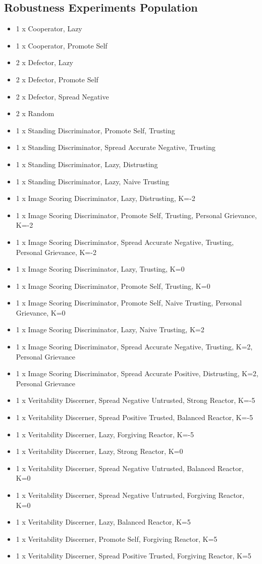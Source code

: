 \documentclass[]{final_report}
\begin{document}
\subsection{Robustness Experiments Population}
\label{appendix:populations}
\begin{itemize}
	\item 1 x Cooperator, Lazy
	\item 1 x Cooperator, Promote Self
	\item 2 x Defector, Lazy
	\item 2 x Defector, Promote Self
	\item 2 x Defector, Spread Negative
	\item 2 x Random
	\item 1 x Standing Discriminator, Promote Self, Trusting
	\item 1 x Standing Discriminator, Spread Accurate Negative, Trusting
	\item 1 x Standing Discriminator, Lazy, Distrusting
	\item 1 x Standing Discriminator, Lazy, Naive Trusting
	\item 1 x Image Scoring Discriminator, Lazy, Distrusting, K=-2
	\item 1 x Image Scoring Discriminator, Promote Self, Trusting, Personal Grievance, K=-2
	\item 1 x Image Scoring Discriminator, Spread Accurate Negative, Trusting, Personal Grievance, K=-2
	\item 1 x Image Scoring Discriminator, Lazy, Trusting, K=0
	\item 1 x Image Scoring Discriminator, Promote Self, Trusting, K=0
	\item 1 x Image Scoring Discriminator, Promote Self, Naive Trusting, Personal Grievance, K=0
	\item 1 x Image Scoring Discriminator, Lazy, Naive Trusting, K=2
	\item 1 x Image Scoring Discriminator, Spread Accurate Negative, Trusting, K=2, Personal Grievance
	\item 1 x Image Scoring Discriminator, Spread Accurate Positive, Distrusting, K=2, Personal Grievance
	\item 1 x Veritability Discerner, Spread Negative Untrusted, Strong Reactor, K=-5
	\item 1 x Veritability Discerner, Spread Positive Trusted, Balanced Reactor, K=-5
	\item 1 x Veritability Discerner, Lazy, Forgiving Reactor, K=-5
	\item 1 x Veritability Discerner, Lazy, Strong Reactor, K=0
	\item 1 x Veritability Discerner, Spread Negative Untrusted, Balanced Reactor, K=0
	\item 1 x Veritability Discerner, Spread Negative Untrusted, Forgiving Reactor, K=0
	\item 1 x Veritability Discerner, Lazy, Balanced Reactor, K=5
	\item 1 x Veritability Discerner, Promote Self, Forgiving Reactor, K=5
	\item 1 x Veritability Discerner, Spread Positive Trusted, Forgiving Reactor, K=5
\end{itemize}
\end{document}
